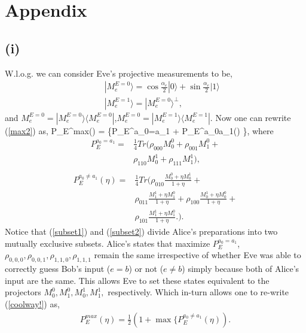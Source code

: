 \appendix
\section*{Appendix}
\subsection*{(i)}
W.l.o.g. we can consider Eve's projective measurements to be, 
\begin{eqnarray}
&& |M_e^{E=0}\rangle=\cos\frac{\alpha_e}{2}|0\rangle+\sin\frac{\alpha_e}{2}|1\rangle \nonumber \\
&& |M_e^{E=1}\rangle = |M_e^{E=0}\rangle^\perp \label{a4},
\end{eqnarray}
and $M_e^{E=0}=|M_e^{E=0}\rangle \langle M_e^{E=0} |$,$M_e^{E=0}=|M_e^{E=1}\rangle \langle M_e^{E=1}|$. Now one can rewrite (\ref{max2}) as,
\be \label{coolway!}
P_E^{max}(\eta) = \max\left\{P_E^{a_0=a_1} + P_E^{a_0\neq a_1}(\eta) \right\},
\ee
where
\begin{equation} \label{subset1}
\begin{split}
P_E^{a_0 = a_1}=&
\frac{1}{4} Tr\bigg(\rho_{000}M^0_0 + \rho_{001}M^0_1 + \\
& \rho_{110}M^1_0 + \rho_{111}M^1_1\bigg), \\ 
\end{split}
\end{equation}
\begin{equation} \label{subset2}
\begin{split}
P_E^{a_0 \neq a_1}(\eta)= & \frac{1}{4} Tr\bigg(\rho_{010}\frac{M^0_0+\eta M^1_0}{1+\eta} + \\ & \rho_{011}\frac{M^1_1+\eta M^0_1}{1+\eta} + \rho_{100}\frac{M^1_0+\eta M^0_0}{1+\eta} + \\ & \rho_{101}\frac{M^1_1+\eta M^0_1}{1+\eta}\bigg.).
\end{split}
\end{equation}
Notice that (\ref{subset1}) and (\ref{subset2}) divide Alice's preparations into two mutually exclusive subsets. Alice's states that maximize $P_E^{a_0=a_1}$, $\rho_{0,0,0},\rho_{0,0,1},\rho_{1,1,0},\rho_{1,1,1}$ remain the same irrespective of whether Eve was able to correctly guess Bob's input ($e=b$) or not ($e\neq b$) simply because both of Alice's input are the same. This allows Eve to set these states equivalent to the projectors $M_0^0,M_1^0,M_0^1,M_1^1,$ respectively.   Which in-turn allows one to re-write (\ref{coolway!}) as,
\begin{equation}
\begin{split} \label{labelme}
P_E^{max}(\eta) = \frac{1}{2}(1+\max\{P_E^{a_0\neq a_1}(\eta)).
\end{split}
\end{equation}
